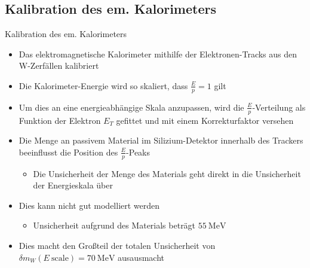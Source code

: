 \documentclass[aspectratio=1610, 9pt]{beamer}
\begin{document}
\subsection{Kalibration des em. Kalorimeters}

\begin{frame}{Kalibration des em. Kalorimeters}
  \begin{itemize}
    \item Das elektromagnetische Kalorimeter mithilfe der Elektronen-Tracks aus den W-Zerfällen kalibriert
    \item Die Kalorimeter-Energie wird so skaliert, dass $\frac{E}{p} = \num{1}$ gilt
    \item Um dies an eine energieabhängige Skala anzupassen, wird die $\frac{E}{p}$-Verteilung als Funktion der Elektron $E_T$ gefittet und mit einem Korrekturfaktor versehen
  \end{itemize}


\end{frame}

\begin{frame}
  \begin{itemize}
    \item Die Menge an passivem Material im Silizium-Detektor innerhalb des Trackers beeinflusst die Position des $\frac{E}{p}$-Peaks
    \begin{itemize}
      \item[\rightarrow] Die Unsicherheit der Menge des Materials geht direkt in die Unsicherheit der Energieskala über
    \end{itemize}
    \item Dies kann nicht gut modelliert werden
    \begin{itemize}
      \item[\rightarrow] Unsicherheit aufgrund des Materials beträgt $\SI{55}{\MeV}$
    \end{itemize}
    \item Dies macht den Großteil der totalen Unsicherheit von $\delta m_W (E \: \text{scale}) = \SI{70}{\MeV}$ ausausmacht
  \end{itemize}
\end{frame}
\end{document}
